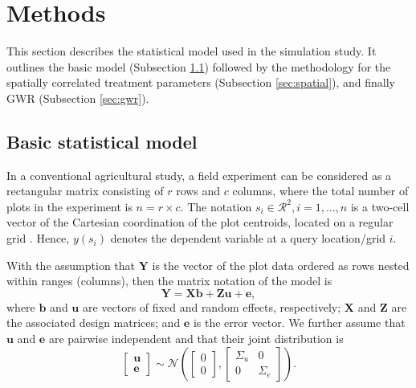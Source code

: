 \documentclass[a4paper]{article} 	%
\newcommand{\N}{\mathcal{N}}
\begin{document}
\section{Methods}\label{Sec:Meth}

This section describes the statistical model used in the simulation study. It outlines the basic model (Subsection \ref{sec:basic}) followed by the methodology for the spatially correlated treatment parameters (Subsection \ref{sec:spatial}), and finally GWR (Subsection \ref{sec:gwr}).


\subsection{Basic statistical model}\label{sec:basic}

In a conventional agricultural study, a field experiment can be considered as a rectangular matrix consisting of $r$ rows and $c$ columns, where the total number of plots in the experiment is $n=r\times c$. The notation $s_i\in \mathcal{R}^2, i=1,\ldots,n$ is a two-cell vector of the Cartesian coordination of the plot centroids, located on a regular grid \parencite{Zimmerman1991Randoma}. Hence, $y(s_i)$ denotes the dependent variable at a query location/grid $i$. 
	
	
With the assumption that $\bm{Y}$ is the vector of the plot data ordered as rows nested within ranges (columns), then the matrix notation of the model is 
\begin{equation}\label{eq:modelmatrix}
	\bm{Y} = \bm{X}\bm{b}+\bm{Z}\bm{u}+\bm{e},
\end{equation}
where $\bm{b}$ and $\bm{u}$ are vectors of fixed and random effects, respectively; $\bm{X}$ and $\bm{Z}$ are the associated design matrices; and $\bm{e}$ is the error vector. We further assume that $\bm{u}$ and $\bm{e}$ are pairwise independent and that their joint distribution is 
\begin{equation}\label{eq:covariance}
	\begin{bmatrix}
		\bm{u} \\ \bm{e}
	\end{bmatrix} \sim \N\left( \begin{bmatrix}
		0\\0 \end{bmatrix}, \begin{bmatrix}
		\Sigma_u & 0 \\ 0 & \Sigma_e
	\end{bmatrix}\right). 
\end{equation}
	
\end{document}
